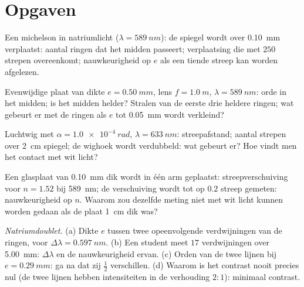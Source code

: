 \section{Opgaven}

\begin{exercise}[$\star$]\label{exo:b2:michelson:1}
Een michelson in natriumlicht ($\lambda = \qty{589}{nm}$): de spiegel wordt over
\qty{0.10}{mm} verplaatst: aantal ringen dat het midden passeert; verplaatsing
die met $250$ strepen overeenkomt; nauwkeurigheid op $e$ als een tiende streep
kan worden afgelezen.
\end{exercise}

\begin{exercise}[$\star$]\label{exo:b2:michelson:2}
Evenwijdige plaat van dikte $e = \qty{0.50}{mm}$, lens $f = \qty{1.0}{m}$,
$\lambda =
\qty{589}{nm}$: orde in het midden; is het midden helder? Stralen
van de
eerste drie heldere ringen; wat gebeurt er met de ringen als $e$ tot
\qty{0.05}{mm} wordt verkleind?
\end{exercise}

\begin{exercise}[$\star$]\label{exo:b2:michelson:3}
Luchtwig met $\alpha = \qty{1.0e-4}{rad}$, $\lambda = \qty{633}{nm}$: streepafstand;
aantal strepen over \qty{2}{cm} spiegel; de wighoek wordt
verdubbeld: wat gebeurt er? Hoe vindt men het contact met wit licht?
\end{exercise}

\begin{exercise}[$\star$]\label{exo:b2:michelson:4}
Een glasplaat van \qty{0.10}{mm} dik wordt in één arm geplaatst:
streepverschuiving voor
$n = 1.52$ bij \qty{589}{nm}; de verschuiving wordt tot op $0.2$ streep
gemeten: nauwkeurigheid
op $n$. Waarom zou dezelfde meting niet met wit licht kunnen worden gedaan
als de plaat \qty{1}{cm} dik was?
\end{exercise}

\begin{exercise}[$\star\star$]\label{exo:b2:michelson:5}
\emph{Natriumdoublet.} (a) Dikte $e$ tussen twee opeenvolgende
verdwijningen van de ringen, voor $\Delta\lambda = \qty{0.597}{nm}$. (b) Een student
meet $17$ verdwijningen over \qty{5.00}{mm}: $\Delta\lambda$ en de
nauwkeurigheid ervan.
(c) Orden van de twee lijnen bij $e = \qty{0.29}{mm}$: ga na dat zij
$\tfrac12$ verschillen. (d) Waarom is het contrast nooit precies nul (de
twee lijnen hebben
intensiteiten in de verhouding $2 : 1$): minimaal contrast.
\end{exercise}


